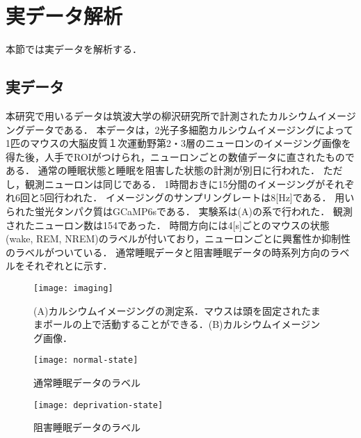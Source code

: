 \section{実データ解析}
本節では実データを解析する．

\subsection{実データ}
本研究で用いるデータは筑波大学の柳沢研究所で計測されたカルシウムイメージングデータである．
本データは，2光子多細胞カルシウムイメージングによって1匹のマウスの大脳皮質１次運動野第2・3層のニューロンのイメージング画像を得た後，人手でROIがつけられ，ニューロンごとの数値データに直されたものである．
通常の睡眠状態と睡眠を阻害した状態の計測が別日に行われた．
ただし，観測ニューロンは同じである．
1時間おきに15分間のイメージングがそれぞれ6回と5回行われた．
イメージングのサンプリングレートは8[Hz]である．
用いられた蛍光タンパク質はGCaMP6sである．
実験系は(A)の系で行われた\cite{Kanda2016}．
観測されたニューロン数は154であった．
時間方向には4[s]ごとのマウスの状態(wake, REM, NREM)のラベルが付いており，ニューロンごとに興奮性か抑制性のラベルがついている．
通常睡眠データと阻害睡眠データの時系列方向のラベルをそれぞれとに示す．

\begin{figure}[htbp]
    \begin{center}
				\texttt{[image: imaging]}
				\caption{(A)カルシウムイメージングの測定系．マウスは頭を固定されたままボールの上で活動することができる．(B)カルシウムイメージング画像．}
        \label{fig:imaging}
    \end{center}
\end{figure}

\begin{figure}[htbp]
	\begin{minipage}{0.5\hsize}
		\begin{center}
			\texttt{[image: normal-state]}
			\caption{通常睡眠データのラベル}
			\label{fig:normal-state}
		\end{center}
	\end{minipage}
	\begin{minipage}{0.5\hsize}
		\begin{center}
				\texttt{[image: deprivation-state]}
				\caption{阻害睡眠データのラベル}
				\label{fig:deprivation-state}
		\end{center}
	\end{minipage}
\end{figure}

